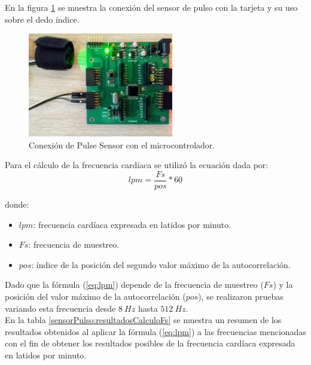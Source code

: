 \documentclass[journal]{IEEEtran}
\begin{document}
En la figura \ref{fig:conexionPS} se muestra la conexión del sensor de pulso con la tarjeta y su uso sobre el dedo índice.

\begin{figure}[htbp!]
	\centering
	\includegraphics[width=2.5in]{AvancesPruebas/imagenes/conexionPS.jpg}
	\caption{Conexión de Pulse Sensor con el microcontrolador.}
	\label{fig:conexionPS}
\end{figure}

Para el cálculo de la frecuencia cardíaca se utilizó la ecuación dada por:
\begin{equation}
	\label{eq:lpm}
	lpm = \frac{Fs}{pos} * 60
\end{equation}

donde:
\begin{itemize}
	\item $lpm$: frecuencia cardíaca expresada en latidos por minuto.
	\item $Fs$: frecuencia de muestreo.
	\item $pos$: índice de la posición del segundo valor máximo de la autocorrelación.\\
\end{itemize}

Dado que la fórmula (\ref{eq:lpm}) depende de la frecuencia de muestreo ($Fs$) y la posición del valor máximo de la autocorrelación ($pos$), se realizaron pruebas variando esta frecuencia desde $8\ Hz$ hasta $512\ Hz$. \\

En la tabla \ref{sensorPulso:resultadosCalculoFs} se muestra un resumen de los resultados obtenidos al aplicar la fórmula (\ref{eq:lpm}) a las frecuencias mencionadas con el fin de obtener los resultados posibles de la frecuencia cardíaca expresada en latidos por minuto. 
\end{document}
